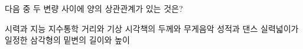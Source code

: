 다음 중 두 변량 사이에 양의 상관관계가 있는 것은?
\begin{choicesii}{시력과 지능 지수}{통학 거리와 기상 시각}{책의 두께와 무게}{음악 성적과 댄스 실력}{넓이가 일정한 삼각형의 밑변의 길이와 높이}\end{choicesii}

